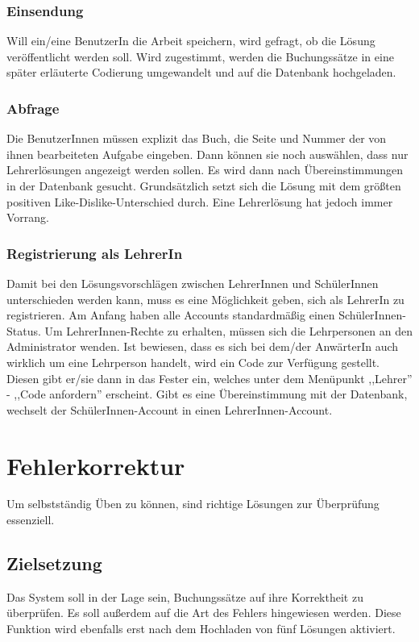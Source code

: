 \documentclass[12pt]{report}
\begin{document}
\subsection{Einsendung}
Will ein/eine BenutzerIn die Arbeit speichern, wird gefragt, ob die Lösung veröffentlicht werden soll. Wird zugestimmt, werden die Buchungssätze in eine später erläuterte Codierung umgewandelt und auf die Datenbank hochgeladen.

\subsection{Abfrage}
Die BenutzerInnen müssen explizit das Buch, die Seite und Nummer der von ihnen bearbeiteten Aufgabe eingeben. Dann können sie noch auswählen, dass nur Lehrerlösungen angezeigt werden sollen. Es wird dann nach Übereinstimmungen in der Datenbank gesucht. Grundsätzlich setzt sich die
Lösung mit dem größten positiven Like-Dislike-Unterschied durch. Eine Lehrerlösung hat jedoch immer Vorrang.

\subsection{Registrierung als LehrerIn}
Damit bei den Lösungsvorschlägen zwischen LehrerInnen und SchülerInnen unterschieden werden kann, muss es eine Möglichkeit geben, sich als LehrerIn zu registrieren. Am Anfang haben alle Accounts standardmäßig einen SchülerInnen-Status. Um LehrerInnen-Rechte zu erhalten, müssen sich die Lehrpersonen an den Administrator wenden. Ist bewiesen, dass es sich bei dem/der AnwärterIn auch wirklich um eine Lehrperson handelt, wird ein Code zur Verfügung gestellt. Diesen gibt er/sie dann in das Fester ein, welches unter dem Menüpunkt ,,Lehrer'' - ,,Code anfordern'' erscheint. Gibt es eine Übereinstimmung mit der Datenbank, wechselt der SchülerInnen-Account in einen LehrerInnen-Account.   



\chapter{Fehlerkorrektur}
\lhead{\thepage}
 
Um selbstständig Üben zu können, sind richtige Lösungen zur Überprüfung essenziell.

\section{Zielsetzung}
Das System soll in der Lage sein, Buchungssätze auf ihre Korrektheit zu überprüfen. Es soll außerdem auf die Art des Fehlers hingewiesen werden. Diese Funktion wird ebenfalls erst nach dem Hochladen von fünf Lösungen aktiviert.
\end{document}
